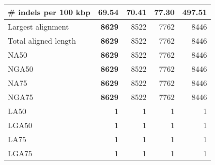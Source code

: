 \documentclass[12pt,a4paper]{article}
\begin{document}
\begin{table}[ht]
\begin{center}
\begin{tabular}{|l*{4}{|r}|}
\# indels per 100 kbp & {\bf 69.54} & 70.41 & 77.30 & 497.51 \\ \hline
Largest alignment & {\bf 8629} & 8522 & 7762 & 8446 \\ \hline
Total aligned length & {\bf 8629} & 8522 & 7762 & 8446 \\ \hline
NA50 & {\bf 8629} & 8522 & 7762 & 8446 \\ \hline
NGA50 & {\bf 8629} & 8522 & 7762 & 8446 \\ \hline
NA75 & {\bf 8629} & 8522 & 7762 & 8446 \\ \hline
NGA75 & {\bf 8629} & 8522 & 7762 & 8446 \\ \hline
LA50 & 1 & 1 & 1 & 1 \\ \hline
LGA50 & 1 & 1 & 1 & 1 \\ \hline
LA75 & 1 & 1 & 1 & 1 \\ \hline
LGA75 & 1 & 1 & 1 & 1 \\ \hline
\end{tabular}
\end{center}
\end{table}
\end{document}
